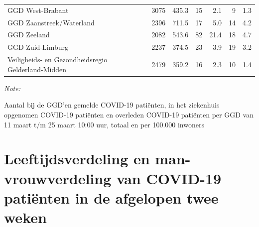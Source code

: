 \documentclass[
  english,
  man,floatsintext]{apa6}
\begin{document}
\begin{table}
\begin{threeparttable}
\begin{tabular}{lrrrrrr}
GGD West-Brabant & 3075 & 435.3 & 15 & 2.1 & 9 & 1.3\\
GGD Zaanstreek/Waterland & 2396 & 711.5 & 17 & 5.0 & 14 & 4.2\\
GGD Zeeland & 2082 & 543.6 & 82 & 21.4 & 18 & 4.7\\
GGD Zuid-Limburg & 2237 & 374.5 & 23 & 3.9 & 19 & 3.2\\
Veiligheids- en Gezondheidsregio Gelderland-Midden & 2479 & 359.2 & 16 & 2.3 & 10 & 1.4\\
\bottomrule
\end{tabular}
\begin{tablenotes}
\item \textit{Note: } 
\item Aantal bij de GGD’en gemelde COVID-19 patiënten, in het ziekenhuis opgenomen COVID-19 patiënten en overleden COVID-19 patiënten per GGD van 11 maart t/m 25 maart 10:00 uur, totaal en per 100.000 inwoners
\end{tablenotes}
\end{threeparttable}
\endgroup{}
\end{table}

\newpage

\hypertarget{leeftijdsverdeling-en-man-vrouwverdeling-van-covid-19-patiuxebnten-in-de-afgelopen-twee-weken}{%
\section{Leeftijdsverdeling en man-vrouwverdeling van COVID-19 patiënten in de afgelopen twee weken}\label{leeftijdsverdeling-en-man-vrouwverdeling-van-covid-19-patiuxebnten-in-de-afgelopen-twee-weken}}
\end{document}
